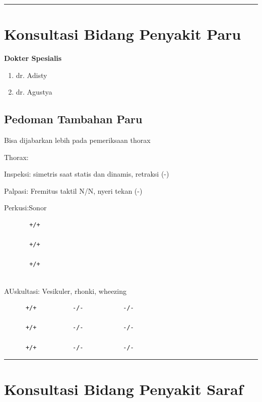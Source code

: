 \documentclass[
]{book}
\providecommand{\tightlist}{%
  \setlength{\itemsep}{0pt}\setlength{\parskip}{0pt}}
\begin{document}
\begin{center}\rule{0.5\linewidth}{0.5pt}\end{center}

\hypertarget{konsultasi-bidang-penyakit-paru}{%
\section{Konsultasi Bidang Penyakit Paru}\label{konsultasi-bidang-penyakit-paru}}

\textbf{Dokter Spesialis}

\begin{enumerate}
\def\labelenumi{\arabic{enumi}.}
\tightlist
\item
  dr. Adisty
\item
  dr. Agustya
\end{enumerate}

\hypertarget{pedoman-tambahan-paru}{%
\subsection{Pedoman Tambahan Paru}\label{pedoman-tambahan-paru}}

Bisa dijabarkan lebih pada pemeriksaan thorax

Thorax:

Inspeksi: simetris saat statis dan dinamis, retraksi (-)

Palpasi: Fremitus taktil N/N, nyeri tekan (-)

Perkusi:Sonor

\begin{verbatim}
       +/+
         
       +/+
             
       +/+
             
\end{verbatim}

AUskultasi: Vesikuler, rhonki, wheezing

\begin{verbatim}
      +/+          -/-           -/-
                    
      +/+          -/-           -/-
      
      +/+          -/-           -/-
\end{verbatim}

\begin{center}\rule{0.5\linewidth}{0.5pt}\end{center}

\hypertarget{konsultasi-bidang-penyakit-saraf}{%
\section{Konsultasi Bidang Penyakit Saraf}\label{konsultasi-bidang-penyakit-saraf}}
\end{document}
